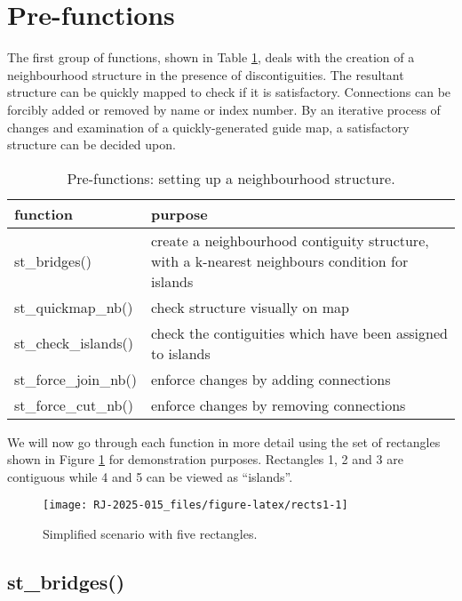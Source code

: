 \section{Pre-functions}\label{pre-functions}

The first group of functions, shown in Table \ref{tab:prefunc-latex}, deals with the creation
of a neighbourhood structure in the presence of discontiguities. The
resultant structure can be quickly mapped to check if it is
satisfactory. Connections can be forcibly added or removed by name or
index number. By an iterative process of changes and examination of a
quickly-generated guide map, a satisfactory structure can be decided upon.

\begin{table}
\centering
\caption{\label{tab:prefunc-latex}Pre-functions: setting up a neighbourhood structure.}
\centering
\fontsize{9}{11}\selectfont
\begin{tabular}[t]{l|>{\raggedright\arraybackslash}p{7cm}}
\hline
\textbf{function} & \textbf{purpose}\\
\hline
st\_bridges() & create a neighbourhood contiguity structure, with a k-nearest neighbours condition for islands\\
\hline
st\_quickmap\_nb() & check structure visually on map\\
\hline
st\_check\_islands() & check the contiguities which have been assigned to islands\\
\hline
st\_force\_join\_nb() & enforce changes by adding connections\\
\hline
st\_force\_cut\_nb() & enforce changes by removing connections\\
\hline
\end{tabular}
\end{table}

We will now go through each function in more detail using the set of rectangles shown in Figure \ref{fig:rects1} for demonstration purposes. Rectangles 1, 2 and 3 are contiguous while 4 and 5 can be viewed as ``islands''.

\begin{figure}

{\centering \texttt{[image: RJ-2025-015\_files/figure-latex/rects1-1]} 

}

\caption{Simplified scenario with five rectangles. }\label{fig:rects1}
\end{figure}

\subsection{st\_bridges()}\label{st_bridges}

